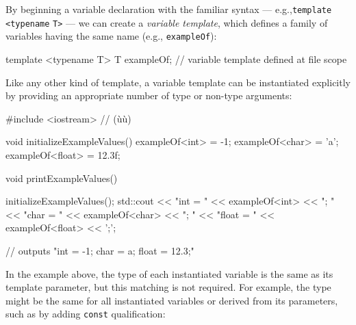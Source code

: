 By beginning a variable declaration with the familiar  syntax --- e.g.,\linebreak[4] \lstinline!template! \lstinline!<typename! \lstinline!T>! --- we can create a \emph{variable template}, which defines a family of variables
having the same name (e.g., \lstinline!exampleOf!):

\begin{emcppslisting}[emcppsbatch=e1]
template <typename T> T exampleOf;  // variable template defined at file scope
\end{emcppslisting}

\noindent Like any other kind of template, a variable template can be instantiated explicitly by
providing an appropriate number of type or non-type arguments:

\begin{emcppslisting}[emcppsbatch=e1]
#include <iostream>  // (ù{}ù)

void initializeExampleValues()
{
    exampleOf<int>   = -1;
    exampleOf<char>  = 'a';
    exampleOf<float> = 12.3f;
}

void printExampleValues()
{
    initializeExampleValues();
    std::cout << "int = "   << exampleOf<int>   << "; "
              << "char = "  << exampleOf<char>  << "; "
              << "float = " << exampleOf<float> << ';';

    // outputs "int = -1; char = a; float = 12.3;"
}
\end{emcppslisting}

\noindent In the example above, the type of each instantiated variable is the same as its template parameter, but this matching is not required. For example, the type might be the same for all instantiated variables or derived from its parameters, such as by adding \lstinline!const! qualification:


